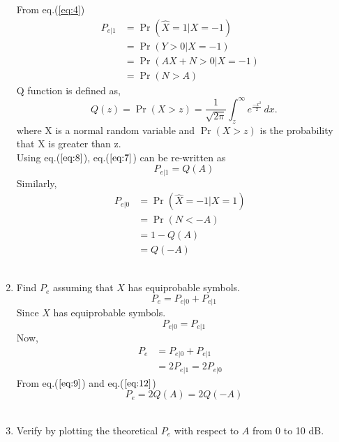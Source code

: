 \documentclass[journal,12pt,twocolumn]{IEEEtran}
\providecommand{\pr}[1]{\ensuremath{\Pr\left(#1\right)}}
\begin{document}
\begin{enumerate}
From eq.(\ref{eq:4})
\begin{align}
P_{e|1}& = \pr{\hat{X} = 1|X=-1}&    \nonumber
\\
&=  \pr{Y>0|X=-1}&
\\
&=  \pr{AX+N>0|X=-1}&
\\
&=  \pr{N>A}&               \label{eq:7}
\end{align}
Q function is defined as,
\begin{equation}
Q(z) =\pr{X>z}= {\frac {1}{\sqrt {2\pi }}}\int _{z}^{\infty }e^{\frac{-x^{2}}{2}}\,dx.               \label{eq:8}
\end{equation}
where X is a  normal random variable and $\pr{X > z}$ is the probability that X is greater than z.
\\
Using eq.($\ref{eq:8}$), eq.($\ref{eq:7}$) can be re-written as
\\
\begin{equation}
P_{e|1} = Q(A)         \label{eq:9}
\end{equation}  
Similarly,
\begin{align}
P_{e|0}& = \pr{\hat{X} = -1|X=1}&    \nonumber
\\
&=  \pr{N<-A}&
\\
&= 1-Q(A)&
\\
&= Q(-A)&       \label{eq:12}
\end{align}
\\
\item Find $P_e$ assuming that $X$ has equiprobable symbols.
\\
\begin{equation}
P_e = P_{e|0}+P_{e|1}          
\end{equation} 
Since $X$ has equiprobable symbols.
\\
\begin{equation}
P_{e|0} = P_{e|1}          
\end{equation} 
Now,
\begin{align}
P_e &= P_{e|0}+P_{e|1}&
\\
&=2P_{e|1}=2P_{e|0}& 
\end{align}
From eq.($\ref{eq:9}$) and eq.($\ref{eq:12}$)
\begin{equation}
P_e=2Q(A)=2Q(-A)
\end{equation}
\\
\item Verify by plotting  the theoretical $P_e$ with respect to $A$ from 0 to 10 dB.
\\        
\begin{figure}[h]
    \centering

\end{figure}
\end{enumerate}
\end{document}
